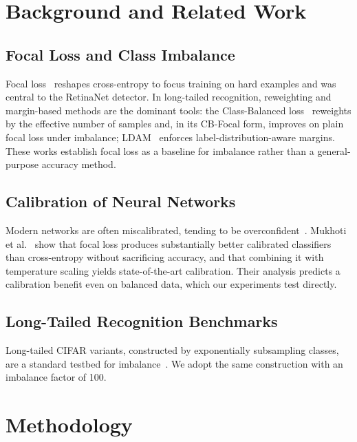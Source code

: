 \documentclass[conference]{IEEEtran}
\begin{document}
\section{Background and Related Work}
\label{sec:related}

\subsection{Focal Loss and Class Imbalance}
Focal loss~\cite{lin2017focal} reshapes cross-entropy to focus training on hard examples and
was central to the RetinaNet detector. In long-tailed recognition, reweighting and margin-based
methods are the dominant tools: the Class-Balanced loss~\cite{cui2019classbalanced} reweights by
the effective number of samples and, in its CB-Focal form, improves on plain focal loss under
imbalance; LDAM~\cite{cao2019ldam} enforces label-distribution-aware margins. These works
establish focal loss as a baseline for imbalance rather than a general-purpose accuracy method.

\subsection{Calibration of Neural Networks}
Modern networks are often miscalibrated, tending to be overconfident~\cite{guo2017calibration}.
Mukhoti et al.~\cite{mukhoti2020calibration} show that focal loss produces substantially better
calibrated classifiers than cross-entropy without sacrificing accuracy, and that combining it
with temperature scaling yields state-of-the-art calibration. Their analysis predicts a
calibration benefit even on balanced data, which our experiments test directly.

\subsection{Long-Tailed Recognition Benchmarks}
Long-tailed CIFAR variants, constructed by exponentially subsampling classes, are a standard
testbed for imbalance~\cite{cui2019classbalanced,buda2018systematic}. We adopt the same
construction with an imbalance factor of 100.

\section{Methodology}
\label{sec:method}
\end{document}
